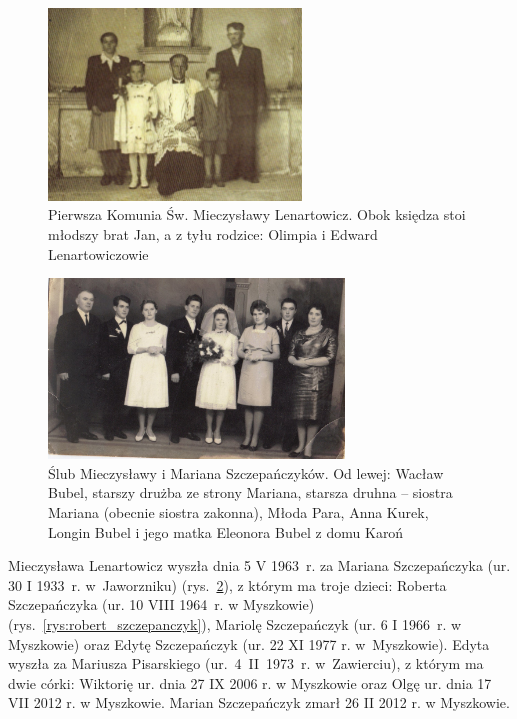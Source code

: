 \begin{figure}[!h]
\begin{center}
\includegraphics[width=0.6\textwidth]{zdjecia/olimpia_edward_lenartowicz_z_dziecmi.jpg}
\caption[Pierwsza Komunia św. Mieczysławy Lenartowicz, zdjęcie z bratem Janem i rodzicami: Olimpią i Edwardem.]{Pierwsza Komunia Św. Mieczysławy Lenartowicz. Obok księdza stoi młodszy brat Jan, a z tyłu rodzice: Olimpia i Edward Lenartowiczowie}
\label{rys:olimpia_edward_lenartowicz_z_dziecmi.jpg}
\end{center}
\end{figure}

\begin{figure}[!b]
\begin{center}
\includegraphics[width=0.7\textwidth]{zdjecia/slub_mieczyslawy_i_mariana_szczepanczykow.jpg}
\caption[Ślub Mieczysławy i Mariana Szczepańczyków]{Ślub Mieczysławy i Mariana Szczepańczyków. Od lewej: Wacław Bubel, starszy drużba ze strony Mariana, starsza druhna -- siostra Mariana (obecnie siostra zakonna), Młoda Para, Anna Kurek, Longin Bubel i jego matka Eleonora Bubel z domu Karoń}
\label{rys:slub_mieczyslawy_i_mariana_szczepanczykow}
\end{center}
\end{figure}

Mieczysława Lenartowicz wyszła dnia 5 V 1963~r. za Mariana Szczepańczyka (ur. 30 I 1933~r. w~Jaworzniku) (rys.~\ref{rys:slub_mieczyslawy_i_mariana_szczepanczykow}), z którym ma troje dzieci: Roberta Szczepańczyka (ur. 10 VIII 1964~r. w Myszkowie) (rys.~\ref{rys:robert_szczepanczyk}), Mariolę Szczepańczyk (ur. 6 I 1966~r. w Myszkowie) oraz Edytę Szczepańczyk (ur. 22 XI 1977 r. w~Myszkowie). Edyta wyszła za Mariusza Pisarskiego (ur.~4~II~1973~r. w~Zawierciu), z którym ma dwie córki: Wiktorię ur. dnia 27 IX 2006 r. w Myszkowie oraz Olgę ur. dnia 17 VII 2012 r. w Myszkowie. Marian Szczepańczyk zmarł 26 II 2012 r. w Myszkowie.

